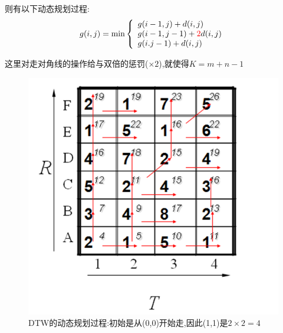 \documentclass[UTF8,a4paper]{ctexart}
\begin{document}
  则有以下动态规划过程:
  \begin{equation}
    g(i,j) = \min  \left \{
    \begin{array}{l}
      g(i - 1,j) + d(i,j)\\
      g(i - 1, j - 1) + {\color{red} 2}d(i , j)\\
      g(i.j - 1) + d(i , j)
    \end{array}
    \right .
  \end{equation}

  这里对走对角线的操作给与双倍的惩罚($\times 2$),就使得$K = m+n-1$

  \begin{figure}[H]
    \centering
    \includegraphics[scale = 0.5]{assets/DynamicTimeWarping(DTW)_6f31e.png}
    \caption{DTW的动态规划过程:初始是从(0,0)开始走,因此(1,1)是$2\times 2 = 4$}
  \end{figure}
  
\end{document}
